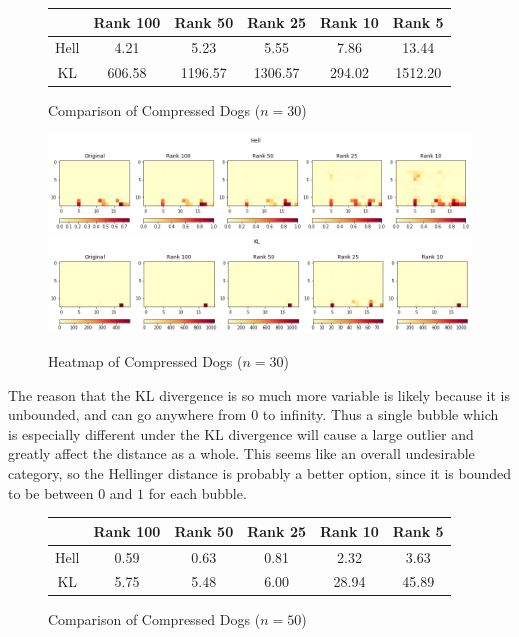 \documentclass{article}
\begin{document}
\begin{figure}[h!]
\begin{center}
\begin{tabular}{ c || c | c | c | c | c }
    & Rank 100 & Rank 50 & Rank 25 & Rank 10 & Rank 5 \\ \hline
    Hell & 4.21 & 5.23 & 5.55 & 7.86 & 13.44 \\
    KL & 606.58 & 1196.57 & 1306.57 & 294.02 & 1512.20
\end{tabular}
\caption{Comparison of Compressed Dogs ($n=30$)}
\label{fig:dog30}
\end{center}
\end{figure}

\begin{figure}[h!]
\begin{center}
\includegraphics[width=\textwidth]{hell-dogs-30.png}
\includegraphics[width=\textwidth]{kl-dogs-30.png}
\caption{Heatmap of Compressed Dogs ($n=30$)}
\label{fig:dogheat30}
\end{center}
\end{figure}

The reason that the KL divergence is so much more variable is likely because it
is unbounded, and can go anywhere from 0 to infinity. Thus a single bubble
which is especially different under the KL divergence will cause a large
outlier and greatly affect the distance as a whole. This seems like an overall
undesirable category, so the Hellinger distance is probably a better option,
since it is bounded to be between $0$ and $1$ for each bubble.

\begin{figure}[h!]
\begin{center}
\begin{tabular}{ c || c | c | c | c | c }
    & Rank 100 & Rank 50 & Rank 25 & Rank 10 & Rank 5 \\ \hline
    Hell & 0.59 & 0.63 & 0.81 & 2.32 & 3.63 \\
    KL & 5.75 & 5.48 & 6.00 & 28.94 & 45.89
\end{tabular}
\caption{Comparison of Compressed Dogs ($n=50$)}
\label{fig:dog50}
\end{center}
\end{figure}
\end{document}

